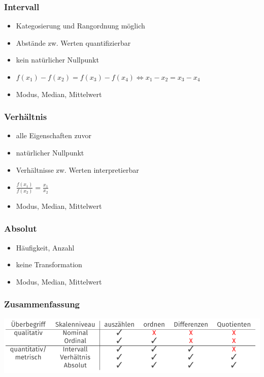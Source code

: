\documentclass[10pt,a4paper,landscape]{article}
\begin{document}
\begin{multicols}{4}
\subsubsection*{Intervall}
\begin{itemize}
\item Kategosierung und Rangordnung möglich
\item Abstände zw. Werten quantifizierbar
\item kein natürlicher Nullpunkt
\item $f(x_1)-f(x_2)=f(x_3)-f(x_4) \Leftrightarrow x_1-x_2=x_3-x_4 $
\item Modus, Median, Mittelwert
\end{itemize}

\subsubsection*{Verhältnis}
\begin{itemize}
\item alle Eigenschaften zuvor
\item natürlicher Nullpunkt
\item Verhältnisse zw. Werten interpretierbar
\item $\frac{f(x_1)}{f(x_2)}=\frac{x_1}{x_2}$
\item Modus, Median, Mittelwert
\end{itemize}

\subsubsection*{Absolut}
\begin{itemize}
\item Häufigkeit, Anzahl
\item keine Transformation
\item Modus, Median, Mittelwert
\end{itemize}

\subsubsection*{Zusammenfassung}

\includegraphics[scale=0.2]{Bilder/Skalen.png} 


\end{multicols}
\end{document}
